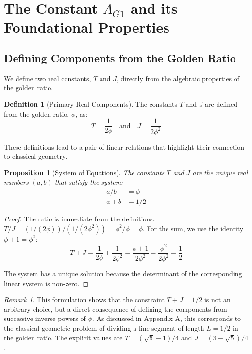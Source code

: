 \documentclass{amsart}
\theoremstyle{plain}
\newtheorem{proposition}[theorem]{Proposition}
\theoremstyle{definition}
\newtheorem{definition}[theorem]{Definition}
\theoremstyle{remark}
\newtheorem*{remark}{Remark}
\newcommand{\LambdaG}{\Lambda_{G1}}
\begin{document}
\section{The Constant \texorpdfstring{$\LambdaG$}{Lambda\_G1} and its Foundational Properties}

\subsection{Defining Components from the Golden Ratio}
We define two real constants, $T$ and $J$, directly from the algebraic properties of the golden ratio.
\begin{definition}[Primary Real Components]
The constants $T$ and $J$ are defined from the golden ratio, $\phi$, as:
$$ T = \frac{1}{2\phi} \quad \text{and} \quad J = \frac{1}{2\phi^2} $$

\end{definition}

These definitions lead to a pair of linear relations that highlight their connection to classical geometry.
\begin{proposition}[System of Equations]
The constants $T$ and $J$ are the unique real numbers $(a,b)$ that satisfy the system:
\begin{align}
    a/b &= \phi \\
    a+b &= 1/2
\end{align}

\end{proposition}
\begin{proof}
The ratio is immediate from the definitions: $T/J = (1/(2\phi))/(1/(2\phi^2)) = \phi^2/\phi = \phi$. For the sum, we use the identity $\phi+1 = \phi^2$:
$$ T+J = \frac{1}{2\phi} + \frac{1}{2\phi^2} = \frac{\phi+1}{2\phi^2} = \frac{\phi^2}{2\phi^2} = \frac{1}{2} $$

The system has a unique solution because the determinant of the corresponding linear system is non-zero.
\end{proof}

\begin{remark}
This formulation shows that the constraint $T+J=1/2$ is not an arbitrary choice, but a direct consequence of defining the components from successive inverse powers of $\phi$. As discussed in Appendix A, this corresponds to the classical geometric problem of dividing a line segment of length $L=1/2$ in the golden ratio. The explicit values are $T = (\sqrt{5}-1)/4$ and $J = (3-\sqrt{5})/4$.
\end{remark}
\end{document}
